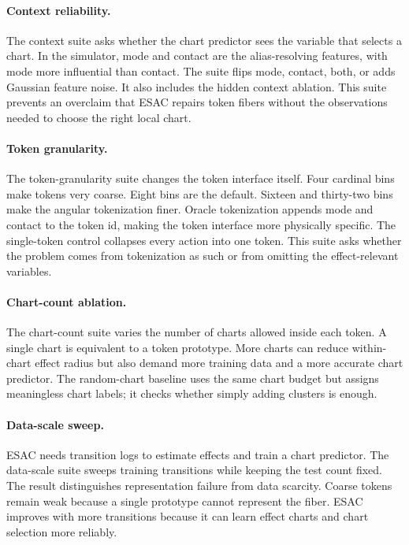 \documentclass{article}
\begin{document}
\paragraph{Context reliability.}
The context suite asks whether the chart predictor sees the variable that
selects a chart. In the simulator, mode and contact are the alias-resolving
features, with mode more influential than contact. The suite flips mode,
contact, both, or adds Gaussian feature noise. It also includes the hidden
context ablation. This suite prevents an overclaim that ESAC repairs token
fibers without the observations needed to choose the right local chart.

\paragraph{Token granularity.}
The token-granularity suite changes the token interface itself. Four cardinal
bins make tokens very coarse. Eight bins are the default. Sixteen and thirty-two
bins make the angular tokenization finer. Oracle tokenization appends mode and
contact to the token id, making the token interface more physically specific.
The single-token control collapses every action into one token. This suite asks
whether the problem comes from tokenization as such or from omitting the
effect-relevant variables.

\paragraph{Chart-count ablation.}
The chart-count suite varies the number of charts allowed inside each token. A
single chart is equivalent to a token prototype. More charts can reduce
within-chart effect radius but also demand more training data and a more
accurate chart predictor. The random-chart baseline uses the same chart budget
but assigns meaningless chart labels; it checks whether simply adding clusters
is enough.

\paragraph{Data-scale sweep.}
ESAC needs transition logs to estimate effects and train a chart predictor. The
data-scale suite sweeps training transitions while keeping the test count fixed.
The result distinguishes representation failure from data scarcity. Coarse
tokens remain weak because a single prototype cannot represent the fiber.
ESAC improves with more transitions because it can learn effect charts and
chart selection more reliably.
\end{document}
